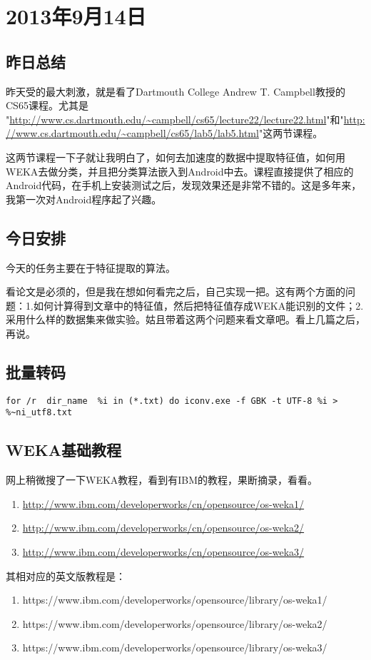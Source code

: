 \chapter{2013年9月14日}
\section{昨日总结}
昨天受的最大刺激，就是看了Dartmouth College Andrew T. Campbell教授的CS65课程。尤其是 "\url{http://www.cs.dartmouth.edu/~campbell/cs65/lecture22/lecture22.html}"和"\url{http://www.cs.dartmouth.edu/~campbell/cs65/lab5/lab5.html}"这两节课程。

这两节课程一下子就让我明白了，如何去加速度的数据中提取特征值，如何用WEKA去做分类，并且把分类算法嵌入到Android中去。课程直接提供了相应的Android代码，在手机上安装测试之后，发现效果还是非常不错的。这是多年来，我第一次对Android程序起了兴趣。

\section{今日安排}
今天的任务主要在于特征提取的算法。

看论文是必须的，但是我在想如何看完之后，自己实现一把。这有两个方面的问题：1.如何计算得到文章中的特征值，然后把特征值存成WEKA能识别的文件；2.采用什么样的数据集来做实验。姑且带着这两个问题来看文章吧。看上几篇之后，再说。

\section{批量转码}
\begin{lstlisting}
for /r  dir_name  %i in (*.txt) do iconv.exe -f GBK -t UTF-8 %i > %~ni_utf8.txt
\end{lstlisting}

\section{WEKA基础教程}
网上稍微搜了一下WEKA教程，看到有IBM的教程，果断摘录，看看。
\begin{enumerate}
  \item \url{http://www.ibm.com/developerworks/cn/opensource/os-weka1/}
  \item \url{http://www.ibm.com/developerworks/cn/opensource/os-weka2/}
  \item \url{http://www.ibm.com/developerworks/cn/opensource/os-weka3/}
\end{enumerate}

其相对应的英文版教程是：
\begin{enumerate}
  \item https://www.ibm.com/developerworks/opensource/library/os-weka1/
  \item https://www.ibm.com/developerworks/opensource/library/os-weka2/
  \item https://www.ibm.com/developerworks/opensource/library/os-weka3/
\end{enumerate}

